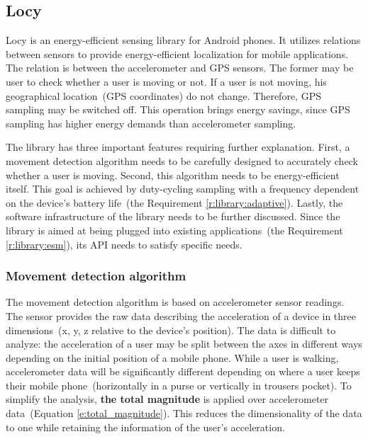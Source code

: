 \subsection{Locy}
\label{s:design:locy}
\hspace{10pt}Locy is an energy-efficient sensing library for Android phones. It utilizes relations between sensors to provide energy-efficient localization for mobile applications. The relation is between the accelerometer and GPS sensors. The former may be user to check whether a user is moving or not. If a user is not moving, his geographical location\ (GPS coordinates) do not change. Therefore, GPS sampling may be switched off. This operation brings energy savings, since GPS sampling has higher energy demands than accelerometer sampling.

The library has three important features requiring further explanation. First, a movement detection algorithm needs to be carefully designed to accurately check whether a user is moving. Second, this algorithm needs to be energy-efficient itself. This goal is achieved by duty-cycling sampling with a frequency dependent on the device's battery life\ (the Requirement \ref{r:library:adaptive}). Lastly, the software infrastructure of the library needs to be further discussed. Since the library is aimed at being plugged into existing applications\ (the Requirement \ref{r:library:esm}), its API needs to satisfy specific needs. 

\subsubsection{Movement detection algorithm}
\label{s:design:locy:moving}
\hspace{10pt}The movement detection algorithm is based on accelerometer sensor readings. The sensor provides the raw data describing the acceleration of a device in three dimensions\ (x, y, z relative to the device's position). The data is difficult to analyze: the acceleration of a user may be split between the axes in different ways depending on the initial position of a mobile phone. While a user is walking, accelerometer data will be significantly different depending on where a user keeps their mobile phone\ (horizontally in a purse or vertically in trousers pocket). To simplify the analysis, \textbf{the total magnitude} is applied over accelerometer data\ (Equation \ref{e:total_magnitude}). This reduces the dimensionality of the data to one while retaining the information of the user's acceleration. 

